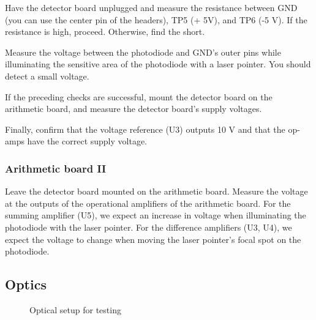 Have the detector board unplugged and measure the resistance between GND (you can use the center pin of the headers), TP5 (+ 5V), and TP6 (-5 V). If the resistance is high, proceed. Otherwise, find the short.

Measure the voltage between the photodiode and GND's outer pins while illuminating the sensitive area of the photodiode with a laser pointer.
You should detect a small voltage.

If the preceding checks are successful, mount the detector board on the arithmetic board, and measure the detector board's supply voltages.

Finally, confirm that the voltage reference (U3) outputs 10 V and that the op-amps have the correct supply voltage.

\subsubsection{Arithmetic board II}

Leave the detector board mounted on the arithmetic board.
Measure the voltage at the outputs of the operational amplifiers of the arithmetic board.
For the summing amplifier (U5), we expect an increase in voltage when illuminating the photodiode with the laser pointer.
For the difference amplifiers (U3, U4), we expect the voltage to change when moving the laser pointer's focal spot on the photodiode.

\subsection{Optics}

\begin{figure}[H]
	\centering
	
	\caption{Optical setup for testing}\label{fig:optical_setup}
\end{figure}